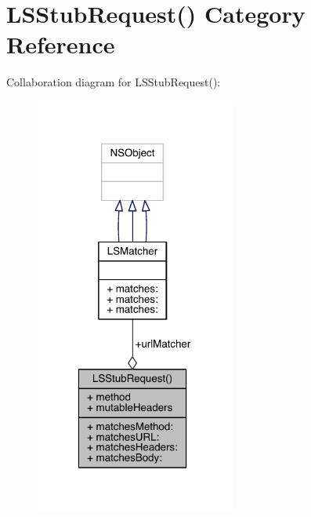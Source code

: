 \hypertarget{category_l_s_stub_request_07_08}{\section{L\-S\-Stub\-Request() Category Reference}
\label{category_l_s_stub_request_07_08}
}


Collaboration diagram for L\-S\-Stub\-Request()\-:\nopagebreak
\begin{figure}[H]
\begin{center}
\leavevmode
\includegraphics[width=187pt]{category_l_s_stub_request_07_08__coll__graph}
\end{center}
\end{figure}

